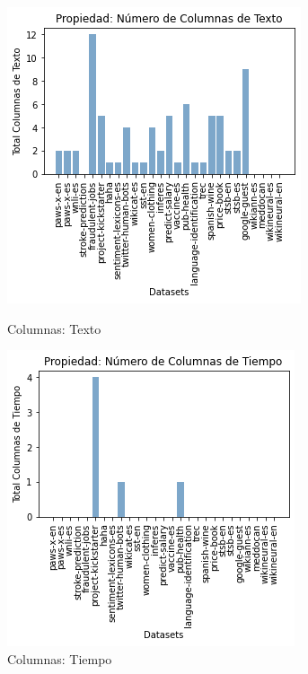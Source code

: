 \begin{figure}
  \centering
    \begin{minipage}[b]{0.31\textwidth}
        \centering
        \includegraphics[width=\textwidth]{Graphics/results/columns_t.png}
          \caption{Columnas: Texto}
          \label{fig:columns-t}
    \end{minipage}      
\hspace{0.03cm}
    \begin{minipage}[b]{0.31\textwidth}
        \centering
        \includegraphics[width=\textwidth]{Graphics/results/columns_d.png}
          \caption{Columnas: Tiempo}
          \label{fig:columns-d}
        \end{minipage} 
\end{figure}

